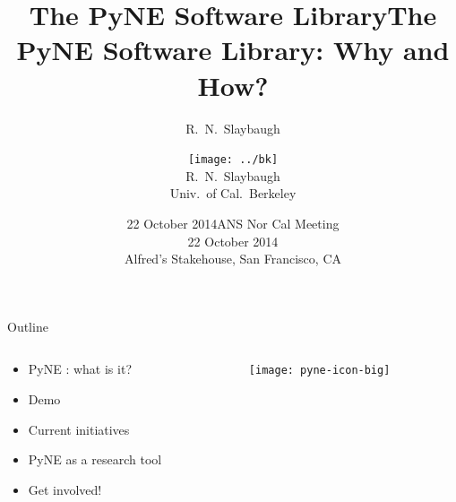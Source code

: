 \documentclass[xcolor=x11names,compress]{beamer}
\title{The PyNE Software Library}
\author{R.\ N.\ Slaybaugh}
\date{22 October 2014}
\renewcommand{\(}{\begin{columns}}
\renewcommand{\)}{\end{columns}}
\newcommand{\<}[1]{\begin{column}{#1}}
\renewcommand{\>}{\end{column}}
\begin{document}
\begin{frame}
\title{The PyNE Software Library: Why and How?}
\author{
        \texttt{[image: ../bk]}\\R.\ N.\ Slaybaugh \\ Univ.\ of Cal.\ Berkeley}

\date{ANS Nor Cal Meeting \\ 22 October 2014\\ Alfred's Stakehouse, San Francisco, CA}
\titlepage
\end{frame}

\begin{frame}{Outline}

	\begin{columns}
  	\begin{column}{0.4\textwidth}
	    \begin{itemize}
        \item PyNE \cite{pyne}: what is it?
        \item Demo
        \item Current initiatives
        \item PyNE as a research tool
        \item Get involved!
	    \end{itemize}
  	\end{column}
 	\begin{column}{0.5\textwidth}
 	   \begin{center}
 	   \begin{figure}
       \texttt{[image: pyne-icon-big]}
	   \end{figure}
 	   \end{center}
  	\end{column}
	\end{columns}

\end{frame}

\end{document}

